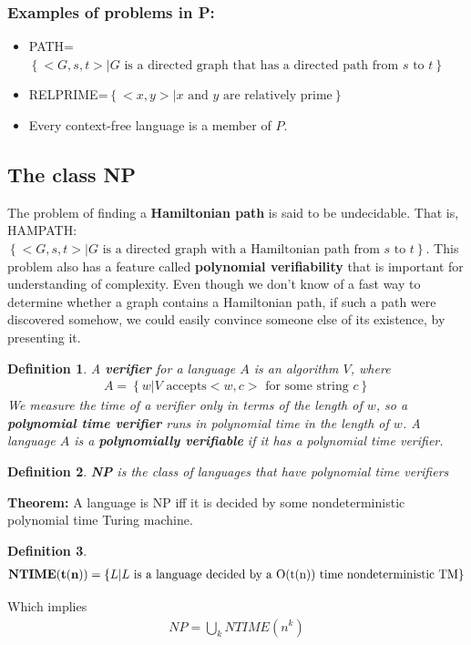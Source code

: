 \documentclass[a4paper]{article}
\newtheorem{mydef}{Definition}
\begin{document}
\subsubsection{Examples of problems in P:}
\begin{itemize}
  \item PATH=$\left\{ <G,s,t>| G \text{ is a directed graph that has a directed path from }s \text{ to } t \right\}$
  \item RELPRIME=$\left\{ <x,y>|x \text{ and } y \text{ are relatively prime} \right\}$
  \item Every context-free language is a member of $P$.
\end{itemize}
\subsection{The class NP} %
\label{sub:The class NP}
The problem of finding a {\bf Hamiltonian path} is said to be undecidable. That is,
HAMPATH: $\left\{ <G,s,t>|G \text{ is a directed graph with a Hamiltonian path from } s \text{ to }t \right\}$. This problem also has a feature called {\bf polynomial verifiability} that is important for understanding of complexity. Even though we don't know of a fast way to determine whether a graph contains a Hamiltonian path, if such a path were discovered somehow, we could easily convince someone else of its existence, by presenting it.\\
\begin{mydef}
  A {\bf verifier} for a language $A$ is an algorithm $V$, where
  \begin{align}
    A=\left\{ w|V \text{ accepts} <w,c> \text{ for some string } c \right\}
  \end{align}
  We measure the time of a verifier only in terms of the length of $w$, so a {\bf polynomial time verifier} runs in polynomial time in the length of $w$. A language $A$ is a {\bf polynomially verifiable} if it has a polynomial time verifier.
\end{mydef}
\begin{mydef}
  {\bf NP} is the class of languages that have polynomial time verifiers
\end{mydef}
{\bf Theorem:} A language is NP iff it is decided by some nondeterministic polynomial time Turing machine.\\
\begin{mydef}
  \begin{align}
    {\bf NTIME(t(n))}=\left\{ L|L \text{ is a language decided by a O(t(n)) time nondeterministic TM} \right\}
  \end{align}
\end{mydef}
Which implies
\begin{align}
  NP=\bigcup_k NTIME(n^k)
\end{align}

\end{document}
